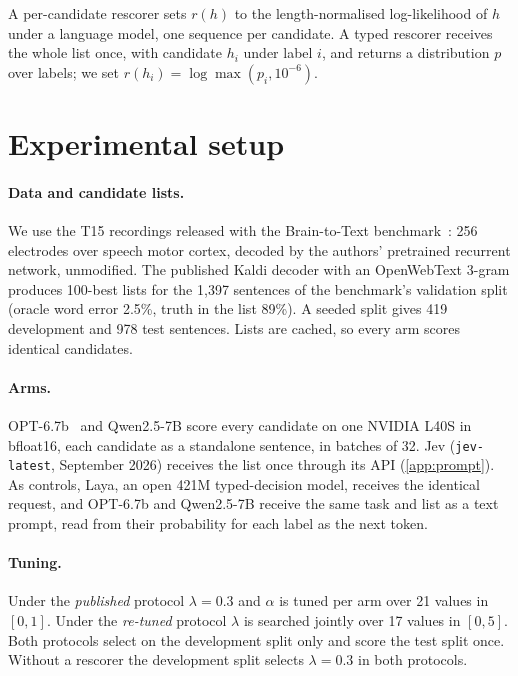 \documentclass[11pt]{article}
\begin{document}
A per-candidate rescorer sets $r(h)$ to the length-normalised log-likelihood of $h$ under
a language model, one sequence per candidate. A typed rescorer receives the whole list
once, with candidate $h_i$ under label $i$, and returns a distribution $p$ over labels; we
set $r(h_i) = \log \max(p_i, 10^{-6})$.

\section{Experimental setup}
\label{sec:setup}

\paragraph{Data and candidate lists.} We use the T15 recordings released with the
Brain-to-Text benchmark~\cite{b2tbench,card2024}: 256 electrodes over speech motor cortex,
decoded by the authors' pretrained recurrent network, unmodified. The published Kaldi
decoder with an OpenWebText 3-gram produces 100-best lists for the 1,397 sentences of the
benchmark's validation split (oracle word error 2.5\%, truth in the list 89\%). A seeded
split gives 419 development and 978 test sentences. Lists are cached, so every arm scores
identical candidates.

\paragraph{Arms.} OPT-6.7b~\cite{zhang2022opt} and Qwen2.5-7B score every candidate on one
NVIDIA L40S in bfloat16, each candidate as a standalone sentence, in batches of 32.
Jev (\texttt{jev-latest}, September 2026) receives the list once through its API
(\cref{app:prompt}). As controls, Laya, an open 421M typed-decision model, receives the
identical request, and OPT-6.7b and Qwen2.5-7B receive the same task and list as a text
prompt, read from their probability for each label as the next token.

\paragraph{Tuning.} Under the \emph{published} protocol $\lambda = 0.3$ and $\alpha$ is
tuned per arm over 21 values in $[0,1]$. Under the \emph{re-tuned} protocol $\lambda$ is
searched jointly over 17 values in $[0,5]$. Both protocols select on the development split
only and score the test split once. Without a rescorer the development split selects
$\lambda = 0.3$ in both protocols.
\end{document}
